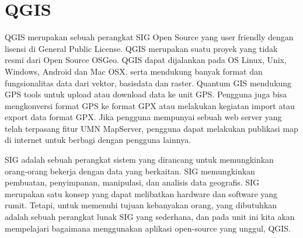 \section{QGIS}
QGIS merupakan sebuah perangkat SIG Open Source yang user friendly dengan lisensi di General Public License. QGIS merupakan suatu proyek yang tidak resmi dari Open Source OSGeo. QGIS dapat dijalankan pada OS Linux, Unix, Windows, Android dan Mac OSX. serta mendukung banyak format dan fungsionalitas data dari vektor, basisdata dan raster.
Quantum GIS mendukung GPS tools untuk upload atau download data ke unit GPS. Pengguna juga bisa mengkonversi format GPS ke format GPX atau melakukan kegiatan import atau export data format GPX.
Jika pengguna mempunyai sebuah web server yang telah terpasang fitur UMN MapServer, pengguna dapat melakukan publikasi map di internet untuk berbagi dengan pengguna lainnya.

SIG adalah sebuah perangkat sistem yang dirancang untuk memungkinkan orang-orang bekerja dengan data yang berkaitan. SIG memungkinkan pembuatan, penyimpanan, manipulasi, dan analisis data geografis. SIG merupakan satu konsep yang dapat melibatkan hardware dan software yang rumit. Tetapi, untuk memenuhi tujuan kebanyakan orang, yang dibutuhkan adalah sebuah perangkat lunak SIG yang sederhana, dan pada unit ini kita akan mempelajari bagaimana menggunakan aplikasi open-source yang unggul, QGIS.

